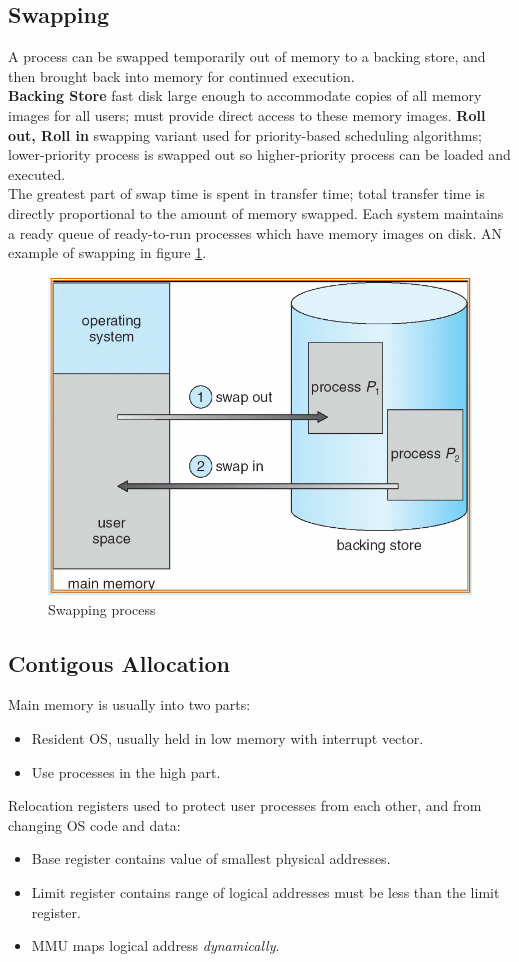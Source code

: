 \documentclass[12pt]{article}
\begin{document}
\subsection{Swapping}
A process can be swapped temporarily out of memory to a backing store, and then brought back into memory for continued execution.\\
\textbf{Backing Store} fast disk large enough to accommodate copies of all memory images for all users; must provide direct access to these memory images. \textbf{Roll out, Roll in} swapping variant used for priority-based scheduling algorithms; lower-priority process is swapped out so higher-priority process can be loaded and executed.\\
The greatest part of swap time is spent in transfer time; total transfer time is directly proportional to the amount of memory swapped. Each system maintains a ready queue of ready-to-run processes which have memory images on disk. AN example of swapping in figure \ref{fig:swap}.
\begin{figure}[H]
  \centering
  \includegraphics[width=0.4\linewidth]{images/swap.png}
  \caption{Swapping process}
  \label{fig:swap}
\end{figure}

\subsection{Contigous Allocation}
Main memory is usually into two parts:
\begin{itemize}
  \item Resident OS, usually held in low memory with interrupt vector.
  \item Use processes in the high part.
\end{itemize}
Relocation registers used to protect user processes from each other, and from changing OS code and data:
\begin{itemize}
  \item Base register contains value of smallest physical addresses.
  \item Limit register contains range of logical addresses must be less than the limit register.
  \item MMU maps logical address \textit{dynamically}.
\end{itemize}
\end{document}
